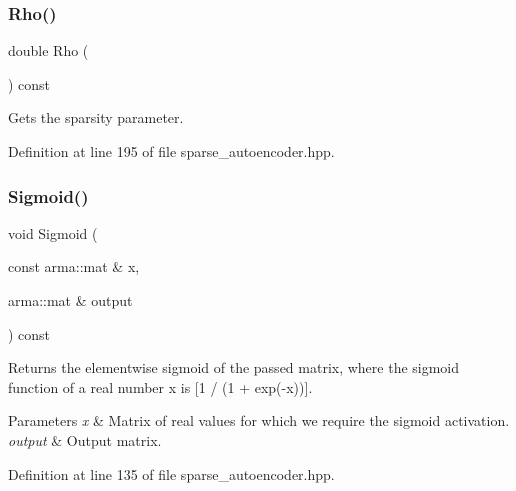 \subsubsection{Rho()\hspace{0.1cm}{\footnotesize\ttfamily [2/2]}}
{\footnotesize\ttfamily double Rho (\begin{DoxyParamCaption}{ }\end{DoxyParamCaption}) const\hspace{0.3cm}{\ttfamily [inline]}}



Gets the sparsity parameter. 



Definition at line 195 of file sparse\+\_\+autoencoder.\+hpp.

\mbox{\label{classmlpack_1_1nn_1_1SparseAutoencoder_a78a48b3c359a36dbc1d6936d7c8ba276}} 
\subsubsection{Sigmoid()}
{\footnotesize\ttfamily void Sigmoid (\begin{DoxyParamCaption}\item[{const arma\+::mat \&}]{x,  }\item[{arma\+::mat \&}]{output }\end{DoxyParamCaption}) const\hspace{0.3cm}{\ttfamily [inline]}}



Returns the elementwise sigmoid of the passed matrix, where the sigmoid function of a real number \textquotesingle{}x\textquotesingle{} is [1 / (1 + exp(-\/x))]. 


\begin{DoxyParams}{Parameters}
{\em x} & Matrix of real values for which we require the sigmoid activation. \\
\hline
{\em output} & Output matrix. \\
\hline
\end{DoxyParams}


Definition at line 135 of file sparse\+\_\+autoencoder.\+hpp.

\mbox{\label{classmlpack_1_1nn_1_1SparseAutoencoder_a56ba0c1d534d55c931e725914b00a100}} 
